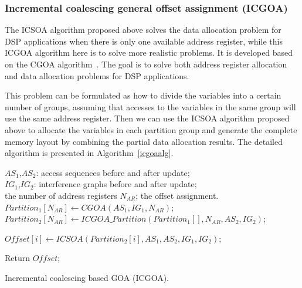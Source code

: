 \subsubsection{Incremental coalescing general offset assignment (ICGOA)}
The ICSOA algorithm proposed above solves the data allocation problem for DSP applications when there is only one 
available address register, while this ICGOA algorithm here is to solve more realistic problems. It is developed based 
on the CGOA algorithm~\cite{related:ottoni}. The goal is to solve both address register allocation and data allocation 
problems for DSP applications.

This problem can be formulated as how to divide the variables into a certain number of groups, assuming that accesses 
to the variables in the same group will use the same address register.
Then we can use the ICSOA algorithm proposed above to allocate the variables in each partition group and generate the 
complete memory layout by combining the partial data allocation
results. The detailed algorithm is presented in Algorithm~\ref{icgoaalg}. 

\begin{algorithm}[htbp]
\singlespace
\begin{algorithmic}[1]
\singlespace
\REQUIRE $\textit{AS}_1$,$\textit{AS}_2$: access sequences before and after update; \\
				 $\textit{IG}_1$,$\textit{IG}_2$: interference graphs before and after update;\\
				 the number of address registers $N_{AR}$;
\ENSURE the offset assignment.\\
\STATE $\textit{Partition}_1[N_{AR}] \leftarrow \textit{CGOA}(\textit{AS}_1,\textit{IG}_1,N_{AR})$;\\
\STATE $\textit{Partition}_2[N_{AR}] \leftarrow  
\textit{ICGOA}\_\textit{Partition}(\textit{Partition}_1[],N_{AR},\textit{AS}_2,\textit{IG}_2)$;

\STATE $\textit{Offset}[i] \leftarrow 
ICSOA(\textit{Partition}_2[i],\textit{AS}_1,\textit{AS}_2,\textit{IG}_1,\textit{IG}_2)$;
\ENDFOR

\STATE Return $\textit{Offset}$;
\caption{Incremental coalescing based GOA (ICGOA).}
\label{icgoaalg}
\end{algorithmic}
\end{algorithm}

